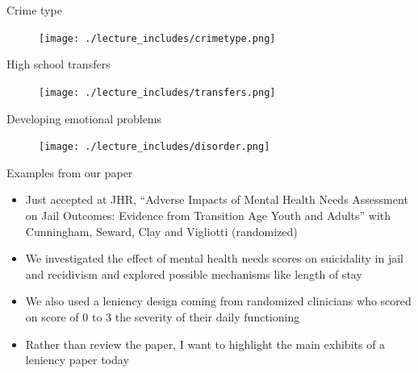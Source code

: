 \documentclass{beamer}
\begin{document}
\begin{frame}{Crime type}
	
	\begin{figure}
	\texttt{[image: ./lecture\_includes/crimetype.png]}
	\end{figure}
\end{frame}


\begin{frame}{High school transfers}
	
	\begin{figure}
	\texttt{[image: ./lecture\_includes/transfers.png]}
	\end{figure}
\end{frame}


\begin{frame}{Developing emotional problems}
	
	\begin{figure}
	\texttt{[image: ./lecture\_includes/disorder.png]}
	\end{figure}
\end{frame}


\begin{frame}{Examples from our paper}

\begin{itemize}
\item Just accepted at JHR, ``Adverse Impacts of Mental Health Needs Assessment on Jail Outcomes: Evidence from Transition Age Youth and Adults'' with Cunningham, Seward, Clay and Vigliotti (randomized)

\item We investigated the effect of mental health needs scores on suicidality in jail and recidivism and explored possible mechanisms like length of stay

\item We also used a leniency design coming from randomized clinicians who scored on score of 0 to 3 the severity of their daily functioning

\item Rather than review the paper, I want to highlight the main exhibits of a leniency paper today

\end{itemize}

\end{frame}
\end{document}
